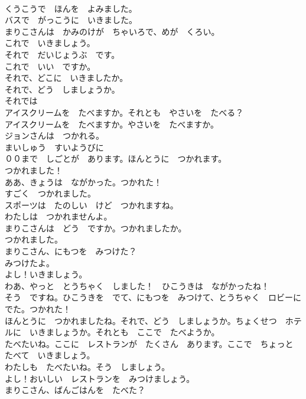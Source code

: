 \documentclass[8pt]{extreport}
\begin{document}
\begin{CJK}{UTF8}{min}
\\	くうこうで　ほんを　よみました。	
\\	バスで　がっこうに　いきました。	
\\	まりこさんは　かみのけが　ちゃいろで、めが　くろい。	
\\	これで　いきましょう。	
\\	それで　だいじょうぶ　です。	
\\	これで　いい　ですか。	
\\	それで、どこに　いきましたか。	
\\	それで、どう　しましょうか。	
\\	それでは	
\\	アイスクリームを　たべますか。それとも　やさいを　たべる？	
\\	アイスクリームを　たべますか。やさいを　たべますか。	
\\	ジョンさんは　つかれる。	
\\	まいしゅう　すいようびに　
\\	００まで　しごとが　あります。ほんとうに　つかれます。	
\\	つかれました！	
\\	ああ、きょうは　ながかった。つかれた！	
\\	すごく　つかれました。	
\\	スポーツは　たのしい　けど　つかれますね。	
\\	わたしは　つかれませんよ。	
\\	まりこさんは　どう　ですか。つかれましたか。	
\\	つかれました。	
\\	まりこさん、にもつを　みつけた？	
\\	みつけたよ。	
\\	よし！いきましょう。	
\\	わあ、やっと　とうちゃく　しました！　ひこうきは　ながかったね！	
\\	そう　ですね。ひこうきを　でて、にもつを　みつけて、とうちゃく　ロビーに　でた。つかれた！	
\\	ほんとうに　つかれましたね。それで、どう　しましょうか。ちょくせつ　ホテルに　いきましょうか。それとも　ここで　たべようか。	
\\	たべたいね。ここに　レストランが　たくさん　あります。ここで　ちょっと　たべて　いきましょう。	
\\	わたしも　たべたいね。そう　しましょう。	
\\	よし！おいしい　レストランを　みつけましょう。	
\\	まりこさん、ばんごはんを　たべた？	

\end{CJK}
\end{document}
